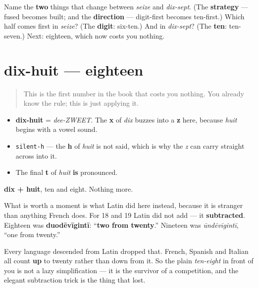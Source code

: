 \begin{tcolorbox}[breakable,colback=teal!4,colframe=teal!35!black,title={Before you move on}]
Name the \textbf{two} things that change between \emph{seize} and \emph{dix-sept}. (The \textbf{strategy} — fused becomes built; and the \textbf{direction} — digit-first becomes ten-first.) Which half comes first in \emph{seize}? (The \textbf{digit}: six-ten.) And in \emph{dix-sept}? (The \textbf{ten}: ten-seven.) Next: eighteen, which now costs you nothing.
\end{tcolorbox}
\section[dix-huit]{dix-huit — eighteen}

\label{lesson:FR-C12-dix-huit}



\begin{quote}
This is the first number in the book that costs you nothing. You already know the rule; this is just applying it.
\end{quote}

\begin{sounds}
\begin{itemize}
\raggedright
  \item \textbf{dix-huit} = \emph{dee-ZWEET}. The \textbf{x} of \emph{dix} buzzes into a \textbf{z} here, because \emph{huit} begins with a vowel sound.
  \item \texttt{silent-h} — the \textbf{h} of \emph{huit} is not said, which is why the \emph{z} can carry straight across into it.
  \item The final \textbf{t} of \emph{huit} \textbf{is} pronounced.
\end{itemize}
\end{sounds}

\begin{cousinweb}
\textbf{dix + huit}, ten and eight. Nothing more.

What is worth a moment is what Latin did here instead, because it is stranger than anything French does. For 18 and 19 Latin did not add — it \textbf{subtracted}. Eighteen was \textbf{duodēvīgintī}: \textquotedblleft{}\textbf{two from twenty}.\textquotedblright{} Nineteen was \emph{ūndēvīgintī}, \textquotedblleft{}one from twenty.\textquotedblright{}

Every language descended from Latin dropped that. French, Spanish and Italian all count \textbf{up} to twenty rather than down from it. So the plain \emph{ten-eight} in front of you is not a lazy simplification — it is the survivor of a competition, and the elegant subtraction trick is the thing that lost.
\end{cousinweb}

